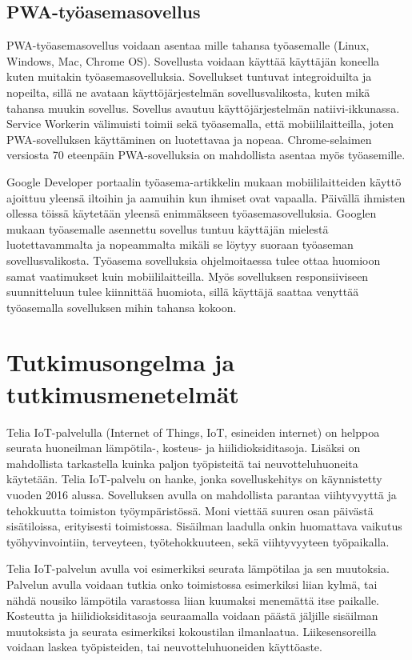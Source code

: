 \documentclass{tktltiki}
\begin{document}
\clearpage

\subsection{PWA-työasemasovellus} 

PWA-työasemasovellus voidaan asentaa mille tahansa työasemalle (Linux, Windows, Mac, Chrome OS). Sovellusta voidaan käyttää käyttäjän koneella kuten muitakin työasemasovelluksia. Sovellukset tuntuvat integroiduilta ja nopeilta, sillä ne avataan käyttöjärjestelmän sovellusvalikosta, kuten mikä tahansa muukin sovellus. Sovellus avautuu käyttöjärjestelmän natiivi-ikkunassa. Service Workerin välimuisti toimii sekä työasemalla, että mobiililaitteilla, joten PWA-sovelluksen käyttäminen on luotettavaa ja nopeaa. Chrome-selaimen versiosta 70 eteenpäin PWA-sovelluksia on mahdollista asentaa myös työasemille. 

Google Developer portaalin työasema-artikkelin mukaan \cite{Google} mobiililaitteiden käyttö ajoittuu yleensä iltoihin ja aamuihin kun ihmiset ovat vapaalla. Päivällä ihmisten ollessa töissä käytetään yleensä enimmäkseen työasemasovelluksia. Googlen mukaan työasemalle asennettu sovellus tuntuu käyttäjän mielestä luotettavammalta ja nopeammalta mikäli se löytyy suoraan työaseman sovellusvalikosta. Työasema sovelluksia ohjelmoitaessa tulee ottaa huomioon samat vaatimukset kuin mobiililaitteilla. Myös sovelluksen responsiiviseen suunnitteluun tulee kiinnittää huomiota, sillä käyttäjä saattaa venyttää työasemalla sovelluksen mihin tahansa kokoon.

\newpage
\section{Tutkimusongelma ja tutkimusmenetelmät}

Telia IoT-palvelulla (Internet of Things, IoT, esineiden internet) on helppoa seurata huoneilman lämpötila-, kosteus- ja hiilidioksiditasoja. Lisäksi on mahdollista tarkastella kuinka paljon työpisteitä tai neuvotteluhuoneita käytetään. Telia IoT-palvelu on hanke, jonka sovelluskehitys on käynnistetty vuoden 2016 alussa. Sovelluksen avulla on mahdollista parantaa viihtyvyyttä ja tehokkuutta toimiston työympäristössä. Moni viettää suuren osan päivästä sisätiloissa, erityisesti toimistossa. Sisäilman laadulla onkin huomattava vaikutus työhyvinvointiin, terveyteen, työtehokkuuteen, sekä viihtyvyyteen työpaikalla. 

Telia IoT-palvelun avulla voi esimerkiksi seurata lämpötilaa ja sen muutoksia. Palvelun avulla voidaan tutkia onko toimistossa esimerkiksi liian kylmä, tai nähdä nousiko lämpötila varastossa liian kuumaksi menemättä itse paikalle. Kosteutta ja hiilidioksiditasoja seuraamalla voidaan päästä jäljille sisäilman muutoksista ja seurata esimerkiksi kokoustilan ilmanlaatua. Liikesensoreilla voidaan laskea työpisteiden, tai neuvotteluhuoneiden käyttöaste. 
\end{document}
